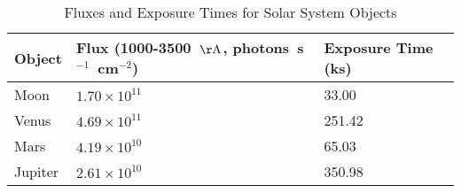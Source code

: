 \begin{table*}
\caption{Fluxes and Exposure Times for Solar System Objects\label{tab:ss_fluxes}}
\begin{center}
\begin{tabular}{lll}
\hline
\hline
Object & Flux (1000-3500~${\rm \AA}$, photons~s$^{-1}$~cm$^{-2}$) & Exposure Time (ks) \\
\hline
Moon & $1.70 \times 10^{11}$ & 33.00 \\
Venus & $4.69 \times 10^{11}$ & 251.42 \\
Mars & $4.19 \times 10^{10}$ & 65.03 \\
Jupiter & $2.61 \times 10^{10}$ & 350.98 \\
\hline
\end{tabular}
\end{center}
\end{table*}
